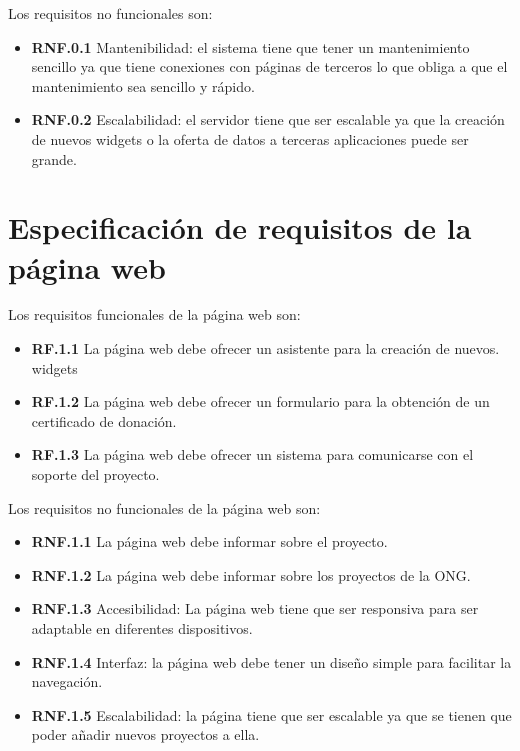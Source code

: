 Los requisitos no funcionales son:

\begin{itemize}
	\item \textbf{RNF.0.1} Mantenibilidad: el sistema tiene que tener un mantenimiento sencillo ya que tiene conexiones con páginas de terceros lo que obliga a que el mantenimiento sea sencillo y rápido.
	\item \textbf{RNF.0.2} Escalabilidad: el servidor tiene que ser escalable ya que la creación de nuevos widgets o la oferta de datos a terceras aplicaciones puede ser grande.
\end{itemize}



\section{Especificación de requisitos de la página web}

Los requisitos funcionales de la página web son:

\begin{itemize}
	\item \textbf{RF.1.1} La página web debe ofrecer un asistente para la creación de nuevos. widgets
	\item \textbf{RF.1.2} La página web debe ofrecer un formulario para la obtención de un certificado de donación.
	\item \textbf{RF.1.3} La página web debe ofrecer un sistema para comunicarse con el soporte del proyecto.
\end{itemize}

Los requisitos no funcionales de la página web son:

\begin{itemize}
	\item \textbf{RNF.1.1} La página web debe informar sobre el proyecto.
	\item \textbf{RNF.1.2} La página web debe informar sobre los proyectos de la ONG.
	\item \textbf{RNF.1.3} Accesibilidad: La página web tiene que ser responsiva para ser adaptable en diferentes dispositivos.
	\item \textbf{RNF.1.4} Interfaz: la página web debe tener un diseño simple para facilitar la navegación.
	\item \textbf{RNF.1.5} Escalabilidad: la página tiene que ser escalable ya que se tienen que poder añadir nuevos proyectos a ella.
\end{itemize}

